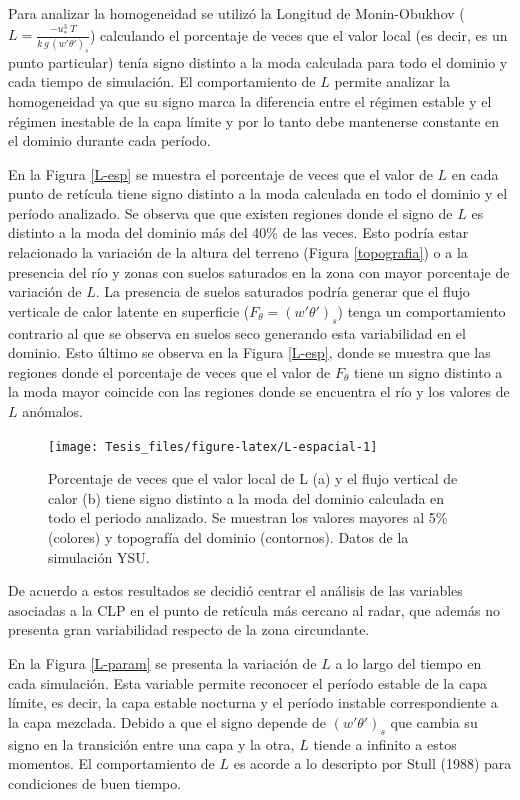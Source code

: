 \documentclass[12pt,spanish,oneside, a4paper]{book}
\begin{document}
Para analizar la homogeneidad se utilizó la Longitud de Monin-Obukhov
(\(L = \frac{-u_*^3 \;T}{k \, g \, (w'\theta ')_s}\)) calculando el
porcentaje de veces que el valor local (es decir, es un punto
particular) tenía signo distinto a la moda calculada para todo el
dominio y cada tiempo de simulación. El comportamiento de \(L\) permite
analizar la homogeneidad ya que su signo marca la diferencia entre el
régimen estable y el régimen inestable de la capa límite y por lo tanto
debe mantenerse constante en el dominio durante cada período.

En la Figura \ref{L-esp} se muestra el porcentaje de veces que el valor
de \(L\) en cada punto de retícula tiene signo distinto a la moda
calculada en todo el dominio y el período analizado. Se observa que que
existen regiones donde el signo de \(L\) es distinto a la moda del
dominio más del 40\% de las veces. Esto podría estar relacionado la
variación de la altura del terreno (Figura \ref{topografia}) o a la
presencia del río y zonas con suelos saturados en la zona con mayor
porcentaje de variación de \(L\). La presencia de suelos saturados
podría generar que el flujo verticale de calor latente en superficie
(\(F_{\theta} = (w'\theta ')_s\)) tenga un comportamiento contrario al
que se observa en suelos seco generando esta variabilidad en el dominio.
Esto último se observa en la Figura \ref{L-esp}, donde se muestra que
las regiones donde el porcentaje de veces que el valor de \(F_{\theta}\)
tiene un signo distinto a la moda mayor coincide con las regiones donde
se encuentra el río y los valores de \(L\) anómalos.

\begin{figure}

{\centering \texttt{[image: Tesis\_files/figure-latex/L-espacial-1]} 

}

\caption{Porcentaje de veces que el valor local de L (a) y el flujo vertical de calor (b) tiene signo distinto a la moda del dominio calculada en todo el periodo analizado. Se muestran los valores mayores al 5\% (colores) y topografía del dominio (contornos). Datos de la simulación YSU. \label{L-esp}}\label{fig:L-espacial}
\end{figure}

De acuerdo a estos resultados se decidió centrar el análisis de las
variables asociadas a la CLP en el punto de retícula más cercano al
radar, que además no presenta gran variabilidad respecto de la zona
circundante.

En la Figura \ref{L-param} se presenta la variación de \(L\) a lo largo
del tiempo en cada simulación. Esta variable permite reconocer el
período estable de la capa límite, es decir, la capa estable nocturna y
el período instable correspondiente a la capa mezclada. Debido a que el
signo depende de \((w'\theta ')_s\) que cambia su signo en la transición
entre una capa y la otra, \(L\) tiende a infinito a estos momentos. El
comportamiento de \(L\) es acorde a lo descripto por Stull (1988) para
condiciones de buen tiempo.
\end{document}

